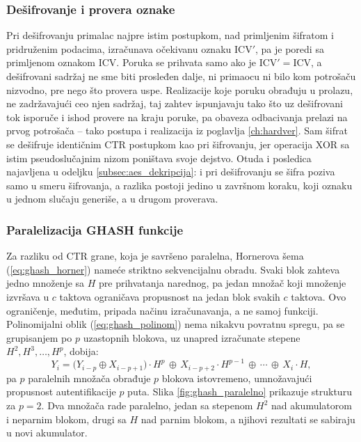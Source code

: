 \subsubsection{Dešifrovanje i provera oznake}

Pri dešifrovanju primalac najpre istim postupkom, nad primljenim šifratom i pridruženim podacima, izračunava očekivanu oznaku $\mathrm{ICV}'$, pa je poredi sa primljenom oznakom $\mathrm{ICV}$. Poruka se prihvata samo ako je $\mathrm{ICV}' = \mathrm{ICV}$, a dešifrovani sadržaj ne sme biti prosleđen dalje, ni primaocu ni bilo kom potrošaču nizvodno, pre nego što provera uspe. Realizacije koje poruku obrađuju u prolazu, ne zadržavajući ceo njen sadržaj, taj zahtev ispunjavaju tako što uz dešifrovani tok isporuče i ishod provere na kraju poruke, pa obaveza odbacivanja prelazi na prvog potrošača -- tako postupa i realizacija iz poglavlja \ref{ch:hardver}. Sam šifrat se dešifruje identičnim CTR postupkom kao pri šifrovanju, jer operacija XOR sa istim pseudoslučajnim nizom poništava svoje dejstvo. Otuda i posledica najavljena u odeljku \ref{subsec:aes_dekripcija}: i pri dešifrovanju se šifra poziva samo u smeru šifrovanja, a razlika postoji jedino u završnom koraku, koji oznaku u jednom slučaju generiše, a u drugom proverava.

\subsubsection{Paralelizacija GHASH funkcije}
\label{subsubsec:ghash_paralelizacija}

Za razliku od CTR grane, koja je savršeno paralelna, Hornerova šema (\ref{eq:ghash_horner}) nameće striktno sekvencijalnu obradu. Svaki blok zahteva jedno množenje sa $H$ pre prihvatanja narednog, pa jedan množač koji množenje izvršava u $c$ taktova ograničava propusnost na jedan blok svakih $c$ taktova. Ovo ograničenje, međutim, pripada načinu izračunavanja, a ne samoj funkciji. Polinomijalni oblik (\ref{eq:ghash_polinom}) nema nikakvu povratnu spregu, pa se grupisanjem po $p$ uzastopnih blokova, uz unapred izračunate stepene $H^2, H^3, \ldots, H^p$, dobija:
\begin{equation}
    Y_{i} = \big(Y_{i-p} \oplus X_{i-p+1}\big) \cdot H^{p} \,\oplus\, X_{i-p+2} \cdot H^{p-1} \,\oplus\, \cdots \,\oplus\, X_{i} \cdot H,
\end{equation}
pa $p$ paralelnih množača obrađuje $p$ blokova istovremeno, umnožavajući propusnost autentifikacije $p$ puta. Slika \ref{fig:ghash_paralelno} prikazuje strukturu za $p=2$. Dva množača rade paralelno, jedan sa stepenom $H^2$ nad akumulatorom i neparnim blokom, drugi sa $H$ nad parnim blokom, a njihovi rezultati se sabiraju u novi akumulator.

